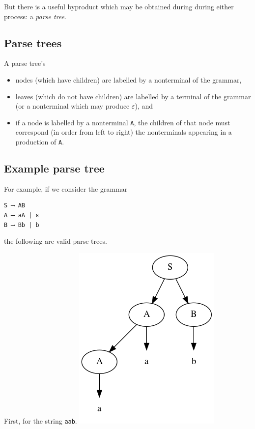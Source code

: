 \documentclass[11pt]{article}
\theoremstyle{definition}
\begin{document}
But there is a useful byproduct which may be obtained during
during either process: a \emph{parse tree}.

\subsection{Parse trees}
\label{sec:org87c35b2}

A parse tree's
\begin{itemize}
\item nodes (which have children) are
labelled by a nonterminal of the grammar,
\item leaves (which do not have children) are
labelled by a terminal of the grammar
(or a nonterminal which may produce \(ε\)), and
\item if a node is labelled by a nonterminal \texttt{A},
the children of that node must correspond
(in order from left to right)
the nonterminals appearing in a production of \texttt{A}.
\end{itemize}

\subsection{Example parse tree}
\label{sec:org922d575}

For example, if we consider the grammar
\begin{verbatim}
S ⟶ AB
A ⟶ aA | ε
B ⟶ Bb | b
\end{verbatim}
the following are valid parse trees.

First, for the string \texttt{aab}.
\includegraphics{media/parse-tree-example-aab.png}
\end{document}
